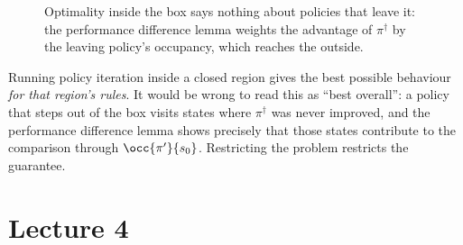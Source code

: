 \documentclass[11pt,a4paper]{article}
\theoremstyle{plain}
\theoremstyle{definition}
\theoremstyle{remark}
\begin{document}
\begin{figure}[h]
\centering
{}
\caption{Optimality inside the box says nothing about policies that leave it: the performance difference lemma weights the advantage of $\pi^\dagger$ by the leaving policy's occupancy, which reaches the outside.}
\end{figure}

\begin{intuition}
Running policy iteration inside a closed region gives the best possible behaviour \emph{for that region's rules}. It would be wrong to read this as ``best overall'': a policy that steps out of the box visits states where $\pi^\dagger$ was never improved, and the performance difference lemma shows precisely that those states contribute to the comparison through $\occ{\pi'}{s_0}$. Restricting the problem restricts the guarantee.
\end{intuition}

\newpage

\setcounter{section}{0}
\renewcommand{\thesection}{\arabic{section}}
\part{Lecture 4}

\vspace{-1.5cm}
\begin{abstract}\noindent
These notes follow the \emph{order of the slides}: each section/subsection carries the (near-verbatim) slide title and, in parentheses, the slide range. The formal statements and proofs of the two companion PDFs are merged at the point where the slides introduce the topic. After each formal result there is a blue \emph{Intuition} box. Material that appears only in the PDFs and has no slide is collected in Appendix~\ref{app:supp}. Where a figure of the slides could not be redrawn (animated GIFs), a red dashed placeholder says which image to paste and where it comes from.
\end{abstract}
\end{document}
